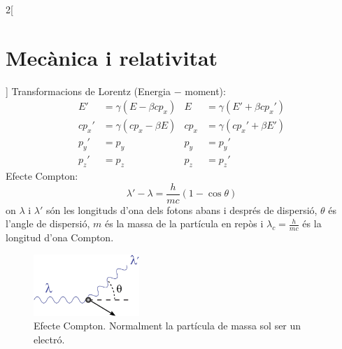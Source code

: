 \documentclass[class=article,10pt,crop=false]{standalone}
\begin{document}
\begin{multicols}{2}[\section{Mecànica i relativitat}]
Transformacions de Lorentz (Energia $-$ moment):
\begin{align*}
    E'&=\gamma(E-\beta cp_x) & E&=\gamma(E'+\beta cp_x')\\
    cp_x'&=\gamma(cp_x-\beta E) & cp_x&=\gamma(cp_x'+\beta E')\\
    p_y'&=p_y & p_y&=p_y'\\
    p_z'&=p_z & p_z&=p_z'
\end{align*}
Efecte Compton:
$$\lambda'-\lambda=\frac{h}{mc}(1-\cos\theta)$$
{on $\lambda$ i $\lambda'$ són les longituds d'ona dels fotons abans i després de dispersió, $\theta$ és l'angle de dispersió, $m$ és la massa de la partícula en repòs i $\lambda_c=\frac{h}{mc}$ és la longitud d'ona Compton.}\newline 
\begin{figure}[ht]
    \centering
    \includegraphics[width=4cm]{Physics/1st/Mecanica_i_relativitat/Imatges/comp.jpg}
    \caption{Efecte Compton. Normalment la par\-tí\-cu\-la de massa sol ser un electró.}
\end{figure}

\end{multicols}
\end{document}
